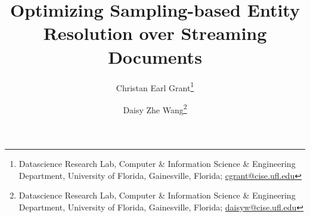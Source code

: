\documentclass[twoside,leqno,twocolumn]{article}
\begin{document}
\title{Optimizing Sampling-based Entity Resolution over Streaming Documents}

\author{%
Christan Earl Grant\thanks{Datascience Research Lab, Computer \& Information Science \& Engineering Department, University of Florida, Gainesville, Florida; \url{cgrant@cise.ufl.edu}} 
\and 
Daisy Zhe Wang\thanks{Datascience Research Lab, Computer \& Information Science \& Engineering Department, University of Florida, Gainesville, Florida; \url{daisyw@cise.ufl.edu}}}

\date{}

\maketitle























\end{document}
